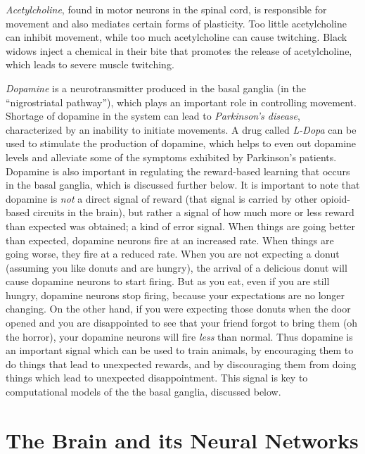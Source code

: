 \emph{Acetylcholine}, found in motor neurons in the spinal cord, is responsible for movement and also mediates certain forms of plasticity. Too little acetylcholine can inhibit movement, while too much acetylcholine can cause twitching. Black widows inject a chemical in their bite that promotes the release of acetylcholine, which leads to severe muscle twitching.

\emph{Dopamine} is a neurotransmitter produced in the basal ganglia (in the ``nigrostriatal pathway''), which plays an important role in controlling movement. Shortage of dopamine in the system can lead to \emph{Parkinson's disease}, characterized by an inability to initiate movements. A drug called \emph{L-Dopa} can be used to stimulate the production of dopamine, which helps to even out dopamine levels and alleviate some of the symptoms exhibited by Parkinson's patients. Dopamine is also important in regulating the reward-based learning that occurs in the basal ganglia, which is discussed further below.  It is important to note that dopamine is \emph{not} a direct signal of reward (that signal is carried by other opioid-based circuits in the brain), but rather a signal of how much more or less reward than expected was obtained; a kind of error signal.  When things are going better than expected, dopamine neurons fire at an increased rate.  When things are going worse, they fire at a reduced rate. When you are not expecting a donut (assuming you like donuts and are hungry), the arrival of a delicious donut will cause dopamine neurons to start firing. But as you eat, even if you are still hungry, dopamine neurons stop firing, because your expectations are no longer changing.  On the other hand, if you were expecting those donuts when the door opened and you are disappointed to see that your friend forgot to bring them (oh the horror), your dopamine neurons will fire \emph{less} than normal. Thus dopamine is an important signal which can be used to train animals, by encouraging them to do things that lead to unexpected rewards, and by discouraging them from doing things which lead to unexpected disappointment. This signal is key to computational models of the  the basal ganglia, discussed below.

\section{The Brain and its Neural Networks}

